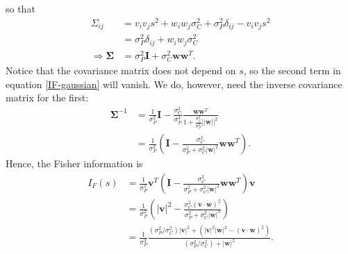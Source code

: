 \documentclass[12pt]{article}
\begin{document}
	so that
	\begin{align}
	\Sigma_{ij} &= v_i v_j s^2 + w_i w_j \sigma_C^2 + \sigma_P^2 \delta_{ij} - v_i v_j s^2 \\
	&= \sigma_P^2 \delta_{ij} + w_i w_j \sigma_C^2 \\
	\Rightarrow \boldsymbol{\Sigma} &= \sigma_P^2 \mathbf{I} + \sigma_C^2\mathbf{ww}^T.
	\end{align}
	Notice that the covariance matrix does not depend on $s$, so the second term in equation \eqref{IF-gaussian} will vanish. We do, however, need the inverse covariance matrix for the first:
	\begin{align}
	\boldsymbol{\Sigma}^{-1} &= \frac{1}{\sigma_P^2} \mathbf{I} - \frac{\sigma_C^2}{\sigma_P^4} \frac{\mathbf{ww}^T}{1+\frac{\sigma_C^2}{\sigma_P^2}||\mathbf{w}||^2}\\
	&= \frac{1}{\sigma_P^2}\left(\mathbf{I} - \frac{\sigma_C^2}{\sigma_P^2 + \sigma_C^2 |\mathbf{w}|^2}\mathbf{ww}^T\right).
	\end{align}
	Hence, the Fisher information is
	\begin{align}
	I_{F}(s) &= \frac{1}{\sigma_P^2}\mathbf{v}^T \left(\mathbf{I} - \frac{\sigma_C^2}{\sigma_P^2 + \sigma_C^2 |\mathbf{w}|^2}\mathbf{ww}^T\right) \mathbf{v} \\
	&= \frac{1}{\sigma_P^2} \left(|\mathbf{v}|^2 - \frac{\sigma_C^2 (\mathbf{v}\cdot\mathbf{w})^2}{\sigma_P^2 + \sigma_C^2 |\mathbf{w}|^2}\right) \\
	&= \frac{1}{\sigma_P^2}\frac{\left(\sigma_P^2/\sigma_C^2\right) |\mathbf{v}|^2 +  \left(|\mathbf{v}|^2|\mathbf{w}|^2 - (\mathbf{v}\cdot\mathbf{w})^2\right)}{(\sigma_P^2/\sigma_C^2)+ |\mathbf{w}|^2}.
	\end{align}
\end{document}
